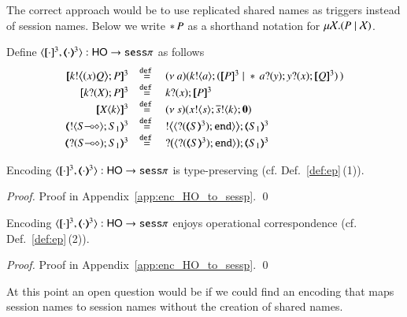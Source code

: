 The correct approach would be to use replicated shared names
as triggers instead of session names. 
Below we write $\ast\,{} P$ as a shorthand notation for $\mu \mathcal{X}. (P \;|\; \mathcal{X})$.

\begin{definition}\rm
	Define $\encod{\cdot}{\cdot}{3}: \HO \to \sesp$ as follows
	\[
	\begin{array}{rcl}
		\pmap{\bbout{k}{\abs{x} Q} P}{3} & \defeq &  \newsp{a}{\bout{k}{a} (\pmap{P}{3} \Par \repl{} \binp{a}{y} \binp{y}{x} \pmap{Q}{3})\,} \\
		\pmap{\binp{k}{X} P}{3} &\defeq&  \binp{k}{x} \pmap{P}{3}\\
		\pmap{\appl{X}{k}}{3} & \defeq & \newsp{s}{\bout{x}{s} \bout{\dual{s}}{k} \inact}\\
		\tmap{\btout{\lhot{S}}S_1}{3} & \defeq & \bbtout{\chtype{\btinp{\tmap{S}{3}}\tinact}}\tmap{S_1}{3} \\
		\tmap{\btinp{\lhot{S}}S_1}{3} & \defeq & \bbtinp{\chtype{\btinp{\tmap{S}{3}}\tinact}}\tmap{S_1}{3}
	\end{array}
	\]
\end{definition}

\begin{proposition}\rm
	Encoding $\encod{\cdot}{\cdot}{3}: \HO \to \sesp$  is type-preserving (cf. Def.~\ref{def:ep}\,(1)).
\end{proposition}

\begin{proof}
	Proof in Appendix~\ref{app:enc_HO_to_sessp}.
	\qed
\end{proof}

\begin{proposition}\rm
	Encoding $\encod{\cdot}{\cdot}{3}: \HO \to \sesp$ 
	enjoys operational correspondence (cf. Def.~\ref{def:ep}\,(2)).
\end{proposition}

\begin{proof}
	Proof in Appendix~\ref{app:enc_HO_to_sessp}.
	\qed
\end{proof}

\begin{comment}
\begin{proof}[Sketch]
For completeness, we 
consider the \HO process $P = {\bbout{k}{\abs{x} Q} P_1} \Par \binp{k}{X} P_2$. We have that
\[
P \red P_1 \Par P_2 \subst{\abs{x}Q}{X}
\]
In the target language, this reduction is mimicked as follows:
\begin{eqnarray*}
\pmap{P}{2} & = & \newsp{a}{\bout{k}{a} (\pmap{P_1}{3} \Par \repl{} \binp{a}{y} \binp{y}{x} \pmap{Q}{3})\,} 
                  \Par \binp{k}{x} \pmap{P_2}{3} \\
            & \red & \newsp{a}{\pmap{P_1}{3} \Par \repl{} \binp{a}{y} \binp{y}{x} \pmap{Q}{3} 
                  \Par  \pmap{P_2}{3}\subst{a}{x}}
\end{eqnarray*}
\qed
\end{proof}
\end{comment}


At this point an open  question would be if we could find an encoding that maps
session names to session names without the creation of shared names.



